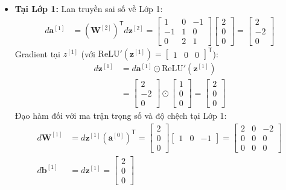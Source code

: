 \begin{itemize}
    \item \textbf{Tại Lớp 1:}
    Lan truyền sai số về Lớp 1:
    \begin{align*}
    d\mathbf{a}^{[1]} &= \left(\mathbf{W}^{[2]}\right)^{\mathsf{T}} d\mathbf{z}^{[2]} = \begin{bmatrix} 1 & 0 & -1 \\ -1 & 1 & 0 \\ 0 & 2 & 1 \end{bmatrix} \begin{bmatrix} 2 \\ 0 \\ 0 \end{bmatrix} = \begin{bmatrix} 2 \\ -2 \\ 0 \end{bmatrix}
    \end{align*}
    Gradient tại $z^{[1]}$ (với $\text{ReLU}'(\mathbf{z}^{[1]}) = \begin{bmatrix} 1 & 0 & 0 \end{bmatrix}^{\mathsf{T}}$):
    \begin{align*}
    d\mathbf{z}^{[1]} &= d\mathbf{a}^{[1]} \odot \text{ReLU}'(\mathbf{z}^{[1]}) \\
    &= \begin{bmatrix} 2 \\ -2 \\ 0 \end{bmatrix} \odot \begin{bmatrix} 1 \\ 0 \\ 0 \end{bmatrix} = \begin{bmatrix} 2 \\ 0 \\ 0 \end{bmatrix}
    \end{align*}
    Đạo hàm đối với ma trận trọng số và độ chệch tại Lớp 1:
    \begin{align*}
    d\mathbf{W}^{[1]} &= d\mathbf{z}^{[1]} \left(\mathbf{a}^{[0]}\right)^{\mathsf{T}} = \begin{bmatrix} 2 \\ 0 \\ 0 \end{bmatrix} \begin{bmatrix} 1 & 0 & -1 \end{bmatrix} = \begin{bmatrix} 2 & 0 & -2 \\ 0 & 0 & 0 \\ 0 & 0 & 0 \end{bmatrix} \\
    d\mathbf{b}^{[1]} &= d\mathbf{z}^{[1]} = \begin{bmatrix} 2 \\ 0 \\ 0 \end{bmatrix}
    \end{align*}
\end{itemize}
